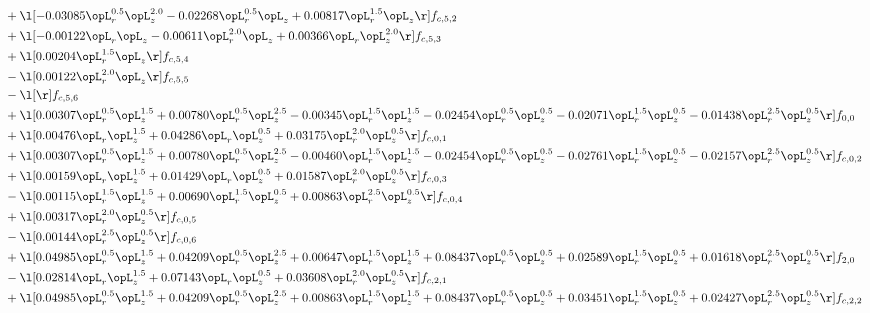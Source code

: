 \begin{alignat}{2}
& + \l[  -0.03085 \opL_r^{0.5} \opL_z^{2.0}   -0.02268 \opL_r^{0.5} \opL_z +  0.00817 \opL_r^{1.5} \opL_z  \r] f_{c,5,2} \nonumber \\ 
& + \l[  -0.00122 \opL_r \opL_z   -0.00611 \opL_r^{2.0} \opL_z +  0.00366 \opL_r \opL_z^{2.0}  \r] f_{c,5,3} \nonumber \\ 
& + \l[  0.00204 \opL_r^{1.5} \opL_z  \r] f_{c,5,4} \nonumber \\ 
& - \l[  0.00122 \opL_r^{2.0} \opL_z  \r] f_{c,5,5} \nonumber \\ 
& - \l[  \r] f_{c,5,6} \nonumber \\ 
& + \l[  0.00307 \opL_r^{0.5} \opL_z^{1.5} +  0.00780 \opL_r^{0.5} \opL_z^{2.5}   -0.00345 \opL_r^{1.5} \opL_z^{1.5}   -0.02454 \opL_r^{0.5} \opL_z^{0.5}   -0.02071 \opL_r^{1.5} \opL_z^{0.5}   -0.01438 \opL_r^{2.5} \opL_z^{0.5}  \r] f_{0,0} \nonumber \\ 
& + \l[  0.00476 \opL_r \opL_z^{1.5} +  0.04286 \opL_r \opL_z^{0.5} +  0.03175 \opL_r^{2.0} \opL_z^{0.5}  \r] f_{c,0,1} \nonumber \\ 
& + \l[  0.00307 \opL_r^{0.5} \opL_z^{1.5} +  0.00780 \opL_r^{0.5} \opL_z^{2.5}   -0.00460 \opL_r^{1.5} \opL_z^{1.5}   -0.02454 \opL_r^{0.5} \opL_z^{0.5}   -0.02761 \opL_r^{1.5} \opL_z^{0.5}   -0.02157 \opL_r^{2.5} \opL_z^{0.5}  \r] f_{c,0,2} \nonumber \\ 
& + \l[  0.00159 \opL_r \opL_z^{1.5} +  0.01429 \opL_r \opL_z^{0.5} +  0.01587 \opL_r^{2.0} \opL_z^{0.5}  \r] f_{c,0,3} \nonumber \\ 
& - \l[  0.00115 \opL_r^{1.5} \opL_z^{1.5} +  0.00690 \opL_r^{1.5} \opL_z^{0.5} +  0.00863 \opL_r^{2.5} \opL_z^{0.5}  \r] f_{c,0,4} \nonumber \\ 
& + \l[  0.00317 \opL_r^{2.0} \opL_z^{0.5}  \r] f_{c,0,5} \nonumber \\ 
& - \l[  0.00144 \opL_r^{2.5} \opL_z^{0.5}  \r] f_{c,0,6} \nonumber \\ 
& + \l[  0.04985 \opL_r^{0.5} \opL_z^{1.5} +  0.04209 \opL_r^{0.5} \opL_z^{2.5} +  0.00647 \opL_r^{1.5} \opL_z^{1.5} +  0.08437 \opL_r^{0.5} \opL_z^{0.5} +  0.02589 \opL_r^{1.5} \opL_z^{0.5} +  0.01618 \opL_r^{2.5} \opL_z^{0.5}  \r] f_{2,0} \nonumber \\ 
& - \l[  0.02814 \opL_r \opL_z^{1.5} +  0.07143 \opL_r \opL_z^{0.5} +  0.03608 \opL_r^{2.0} \opL_z^{0.5}  \r] f_{c,2,1} \nonumber \\ 
& + \l[  0.04985 \opL_r^{0.5} \opL_z^{1.5} +  0.04209 \opL_r^{0.5} \opL_z^{2.5} +  0.00863 \opL_r^{1.5} \opL_z^{1.5} +  0.08437 \opL_r^{0.5} \opL_z^{0.5} +  0.03451 \opL_r^{1.5} \opL_z^{0.5} +  0.02427 \opL_r^{2.5} \opL_z^{0.5}  \r] f_{c,2,2} \nonumber \\ 

\end{alignat}
